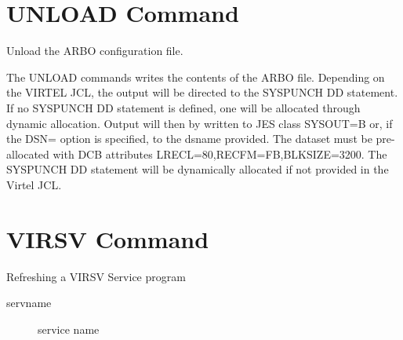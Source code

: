 \documentclass[letterpaper,10pt,english]{sphinxmanual}
\begin{document}
\ignorespaces 

\section{UNLOAD Command}
\label{\detokenize{audit_operations_ and_performance:unload-command}}\label{\detokenize{audit_operations_ and_performance:index-31}}
Unload the ARBO configuration file.

\begin{sphinxVerbatim}[commandchars=\\\{\}]
\end{sphinxVerbatim}

The UNLOAD commands writes the contents of the ARBO file. Depending on the VIRTEL JCL, the output will be directed to the SYSPUNCH DD statement. If no SYSPUNCH DD statement is defined, one will be allocated through dynamic allocation. Output will then by written to JES class SYSOUT=B or, if the DSN= option is specified, to the dsname provided. The dataset must be pre-allocated with DCB attributes LRECL=80,RECFM=FB,BLKSIZE=3200. The SYSPUNCH DD statement will be dynamically allocated if not provided in the Virtel JCL.

\ignorespaces 

\section{VIRSV Command}
\label{\detokenize{audit_operations_ and_performance:virsv-command}}\label{\detokenize{audit_operations_ and_performance:index-32}}
Refreshing a VIRSV Service program

\begin{sphinxVerbatim}[commandchars=\\\{\}]
\end{sphinxVerbatim}
\begin{description}
\item[{servname}] \leavevmode
service name

\end{description}
\end{document}
